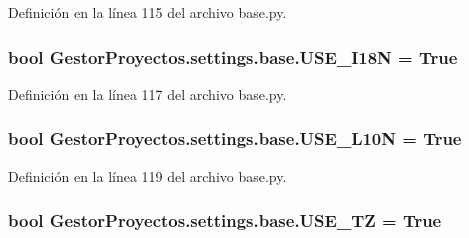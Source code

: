 Definición en la línea 115 del archivo base.\+py.

\subsubsection[{\texorpdfstring{U\+S\+E\+\_\+\+I18N}{USE_I18N}}]{\setlength{\rightskip}{0pt plus 5cm}bool Gestor\+Proyectos.\+settings.\+base.\+U\+S\+E\+\_\+\+I18N = True}\hypertarget{namespace_gestor_proyectos_1_1settings_1_1base_af0547c777b06e12e1ac8816824b55435}{}\label{namespace_gestor_proyectos_1_1settings_1_1base_af0547c777b06e12e1ac8816824b55435}


Definición en la línea 117 del archivo base.\+py.

\subsubsection[{\texorpdfstring{U\+S\+E\+\_\+\+L10N}{USE_L10N}}]{\setlength{\rightskip}{0pt plus 5cm}bool Gestor\+Proyectos.\+settings.\+base.\+U\+S\+E\+\_\+\+L10N = True}\hypertarget{namespace_gestor_proyectos_1_1settings_1_1base_a723a2313195a86c49be17bc05f0d8d43}{}\label{namespace_gestor_proyectos_1_1settings_1_1base_a723a2313195a86c49be17bc05f0d8d43}


Definición en la línea 119 del archivo base.\+py.

\subsubsection[{\texorpdfstring{U\+S\+E\+\_\+\+TZ}{USE_TZ}}]{\setlength{\rightskip}{0pt plus 5cm}bool Gestor\+Proyectos.\+settings.\+base.\+U\+S\+E\+\_\+\+TZ = True}\hypertarget{namespace_gestor_proyectos_1_1settings_1_1base_a7e2c87b697877a56ac16e367e3a2aa8d}{}\label{namespace_gestor_proyectos_1_1settings_1_1base_a7e2c87b697877a56ac16e367e3a2aa8d}


